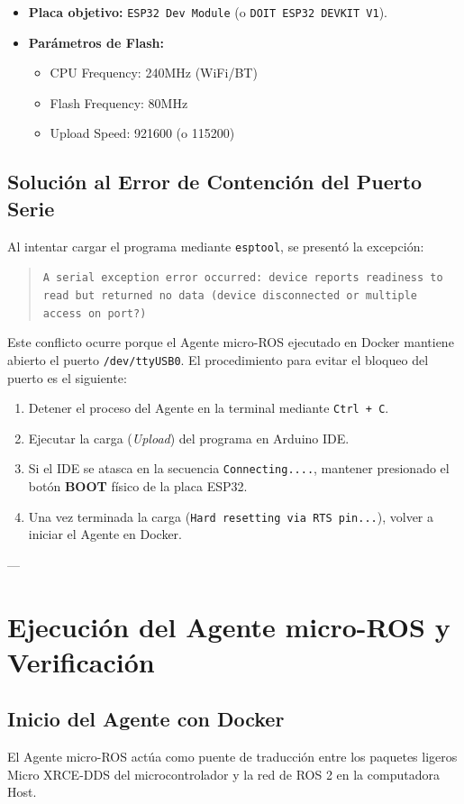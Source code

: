 \documentclass[12pt,a4paper]{article}
\begin{document}
\begin{itemize}
    \item \textbf{Placa objetivo:} \texttt{ESP32 Dev Module} (o \texttt{DOIT ESP32 DEVKIT V1}).
    \item \textbf{Parámetros de Flash:}
    \begin{itemize}
        \item CPU Frequency: 240MHz (WiFi/BT)
        \item Flash Frequency: 80MHz
        \item Upload Speed: 921600 (o 115200)
    \end{itemize}
\end{itemize}

\subsection{Solución al Error de Contención del Puerto Serie}
Al intentar cargar el programa mediante \texttt{esptool}, se presentó la excepción:
\begin{quote}
\texttt{A serial exception error occurred: device reports readiness to read but returned no data (device disconnected or multiple access on port?)}
\end{quote}

Este conflicto ocurre porque el Agente micro-ROS ejecutado en Docker mantiene abierto el puerto \texttt{/dev/ttyUSB0}. El procedimiento para evitar el bloqueo del puerto es el siguiente:

\begin{enumerate}
    \item Detener el proceso del Agente en la terminal mediante \texttt{Ctrl + C}.
    \item Ejecutar la carga (\textit{Upload}) del programa en Arduino IDE.
    \item Si el IDE se atasca en la secuencia \texttt{Connecting....}, mantener presionado el botón \textbf{BOOT} físico de la placa ESP32.
    \item Una vez terminada la carga (\texttt{Hard resetting via RTS pin...}), volver a iniciar el Agente en Docker.
\end{enumerate}

---

\section{Ejecución del Agente micro-ROS y Verificación}

\subsection{Inicio del Agente con Docker}
El Agente micro-ROS actúa como puente de traducción entre los paquetes ligeros Micro XRCE-DDS del microcontrolador y la red de ROS 2 en la computadora Host.
\end{document}

